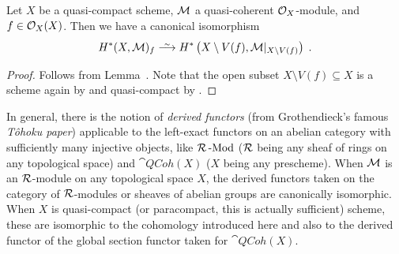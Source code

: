 \documentclass[a4paper,parskip=half,numbers=enddot, DIV=12]{scrreprt}
\begin{document}
\begin{prop}
	Let $X$ be a quasi-compact scheme, $\mathcal{M}$ a quasi-coherent $\mathcal{O}_X$-module, and $f\in\mathcal{O}_X(X)$. Then we have a canonical isomorphism
	\begin{align*}
		H^*(X,\Mm)_f\isomorphism H^*\left(X\setminus V(f),\Mm|_{X\setminus V(f)}\right)\;.
	\end{align*}
\end{prop}
\begin{proof}
	Follows from Lemma~. Note that the open subset $X\setminus V(f)\subseteq X$ is a scheme again by \cite[Fact~1.5.9]{alggeo1} and quasi-compact by \cite[Fact~2.1.2]{alggeo1}.
\end{proof}
\begin{rem*}
	In general, there is the notion of \emph{derived functors} (from Grothendieck's famous \emph{T\^{o}hoku paper}) applicable to the left-exact functors on an abelian category with sufficiently many injective objects, like $\mathcal{R}\operatorname{-Mod}$ ($\mathcal{R}$ being any sheaf of rings on any topological space) and $\cat{QCoh}(X)$ ($X$ being any prescheme). When $\mathcal{M}$ is an $\mathcal{R}$-module on any topological space $X$, the derived functors taken on the category of $\mathcal{R}$-modules or sheaves of abelian groups are canonically isomorphic. When $X$ is quasi-compact (or paracompact, this is actually sufficient) scheme, these are isomorphic to the cohomology introduced here and also to the derived functor of the global section functor taken for $\cat{QCoh}(X)$.
\end{rem*}
\end{document}
